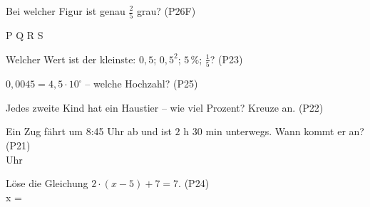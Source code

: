 \documentclass[11pt]{article}
\begin{document}
\small

\begin{aufgabe}{Bei welcher Figur ist genau $\frac{2}{5}$ grau? \hfill (P26F) \\    }

P  \quad Q  \quad R  \quad S 
\end{aufgabe}

\begin{aufgabe}{Welcher Wert ist der kleinste: $0{,}5$; $0{,}5^2$; $5\,\%$; $\frac{1}{5}$? \hfill (P23) \\ \leerfeld}
\end{aufgabe}

\begin{aufgabe}{$0{,}0045 = 4{,}5 \cdot 10^{\square}$ – welche Hochzahl? \hfill (P25) \\ \leerfeld}
\end{aufgabe}

\begin{aufgabe}{Jedes zweite Kind hat ein Haustier – wie viel Prozent? Kreuze an. \hfill (P22) \\    }
\end{aufgabe}

\begin{aufgabe}{Ein Zug fährt um 8:45 Uhr ab und ist $2$ h $30$ min unterwegs. Wann kommt er an? \hfill (P21) \\ \leerfeld Uhr}
\end{aufgabe}

\begin{aufgabe}{Löse die Gleichung $2 \cdot (x - 5) + 7 = 7$. \hfill (P24) \\ x = \leerfeld}
\end{aufgabe}
\end{document}
